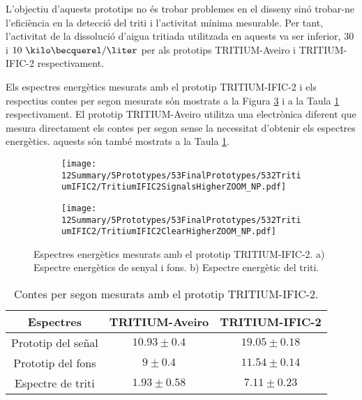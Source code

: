 L'objectiu d'aquests prototips no és trobar problemes en el disseny sinó trobar-ne l'eficiència en la detecció del triti i l'activitat mínima mesurable. Per tant, l'activitat de la dissolució d'aigua tritiada utilitzada en aquests va ser inferior, $30$ i $10~\kilo\becquerel/\liter$ per als prototips TRITIUM-Aveiro i TRITIUM-IFIC-2 respectivament.

Els espectres energètics mesurats amb el prototip TRITIUM-IFIC-2 i els respectius contes per segon mesurats són  mostrats a la Figura \ref{fig:EspectresEnergeticsTRITIUMIFIC2} i a la Taula \ref{tab:ContesPerSegonTRITIUMIFIC2} respectivament. El prototip TRITIUM-Aveiro utilitza una electrònica diferent que mesura directament els contes per segon sense la necessitat d'obtenir els espectres energètics. aquests són també mostrats a la Taula \ref{tab:ContesPerSegonTRITIUMIFIC2}.

\begin{figure}
\centering
    \begin{subfigure}[b]{1\textwidth}
    \centering
    \texttt{[image: 12Summary/5Prototypes/53FinalPrototypes/532TritiumIFIC2/TritiumIFIC2SignalsHigherZOOM\_NP.pdf]}  
    \caption{\label{subfig:EspectreEnergeticSenyalFonsTritiumIFIC2}}
    \end{subfigure}
    \hfill
    \begin{subfigure}[b]{1\textwidth}
    \centering
    \texttt{[image: 12Summary/5Prototypes/53FinalPrototypes/532TritiumIFIC2/TritiumIFIC2ClearHigherZOOM\_NP.pdf]}  
    \caption{\label{subfig:EspectreEnergeticTritiTritiumIFIC2}}
    \end{subfigure}
 \caption{Espectres energètics mesurats amb el prototip TRITIUM-IFIC-2. a) Espectre energètics de senyal i fons. b) Espectre energètic del triti.}
 \label{fig:EspectresEnergeticsTRITIUMIFIC2}
\end{figure}

\begin{table}[htbp]
\centering{}%
\begin{tabular}{ccc}
\toprule 
Espectres & TRITIUM-Aveiro & TRITIUM-IFIC-2  \tabularnewline
\midrule
\midrule 
Prototip del señal & $10.93 \pm 0.4$ & $19.05 \pm 0.18$ \tabularnewline
Prototip del fons & $9 \pm 0.4$ & $11.54 \pm 0.14$ \tabularnewline  
Espectre de triti & $1.93 \pm 0.58$ & $7.11 \pm 0.23$ \tabularnewline
\bottomrule
\end{tabular}
\caption{Contes per segon mesurats amb el prototip TRITIUM-IFIC-2.}
\label{tab:ContesPerSegonTRITIUMIFIC2}
\end{table}

